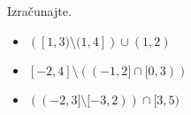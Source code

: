         
            \begin{naloga}
                Izračunajte.
                \begin{itemize}
                        \item $\left([1,3)\setminus(1,4]\right)\cup(1,2)$ 
                        \item $[-2,4]\setminus\left((-1,2]\cap[0,3)\right)$ 
                        \item $\left((-2,3]\setminus[-3,2)\right)\cap[3,5)$ 
                \end{itemize}
            \end{naloga}
        




